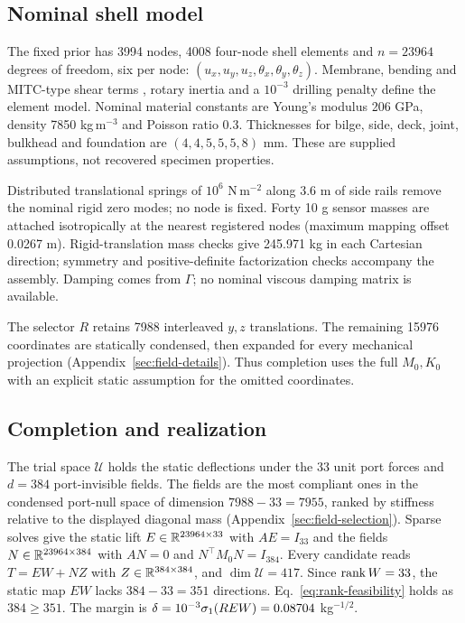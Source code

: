 \subsection{Nominal shell model}
The fixed prior has 3994 nodes, 4008 four-node shell elements and
$n=23964$ degrees of freedom, six per node:
$(u_x,u_y,u_z,\theta_x,\theta_y,\theta_z)$.
Membrane, bending and MITC-type shear terms \citep{bathe1986}, rotary
inertia and a $10^{-3}$ drilling penalty define the element model.
Nominal material constants are Young's modulus 206 GPa, density
7850 kg\,m$^{-3}$ and Poisson ratio 0.3. Thicknesses for bilge, side,
deck, joint, bulkhead and foundation are $(4,4,5,5,5,8)$ mm.
These are supplied assumptions, not recovered specimen properties.

Distributed translational springs of $10^6$ N\,m$^{-2}$ along 3.6 m of
side rails remove the nominal rigid zero modes; no node is fixed. Forty
10 g sensor masses are attached isotropically at the nearest registered
nodes (maximum mapping offset 0.0267 m). Rigid-translation mass checks give
245.971 kg in each Cartesian direction; symmetry and positive-definite
factorization checks accompany the assembly. Damping comes from $\Gamma$;
no nominal viscous damping matrix is available.

The selector $R$ retains 7988 interleaved $y,z$ translations. The remaining
15976 coordinates are statically condensed, then expanded for every
mechanical projection (Appendix~\ref{sec:field-details}). Thus completion
uses the full $M_0,K_0$ with an explicit static assumption for the omitted
coordinates.

\subsection{Completion and realization}
The trial space $\mathcal U$ holds the static deflections under the 33 unit
port forces and $d=384$ port-invisible fields. The fields are the most
compliant ones in the condensed port-null space of dimension $7988-33=7955$,
ranked by stiffness relative to the displayed diagonal mass
(Appendix~\ref{sec:field-selection}). Sparse solves give the static lift $E\in\mathbb R^{23964\times33}$ with
$AE=I_{33}$ and the fields $N\in\mathbb R^{23964\times384}$ with $AN=0$ and
$N^{\top}M_0N=I_{384}$. Every candidate reads $T=EW+NZ$ with
$Z\in\mathbb R^{384\times384}$, and $\dim\mathcal U=417$. Since $\operatorname{rank} W=33$, the
static map $EW$ lacks $384-33=351$ directions. Eq.~\eqref{eq:rank-feasibility}
holds as $384\ge351$. The margin is
$\delta=10^{-3}\sigma_1(REW)=0.08704$ kg$^{-1/2}$.

